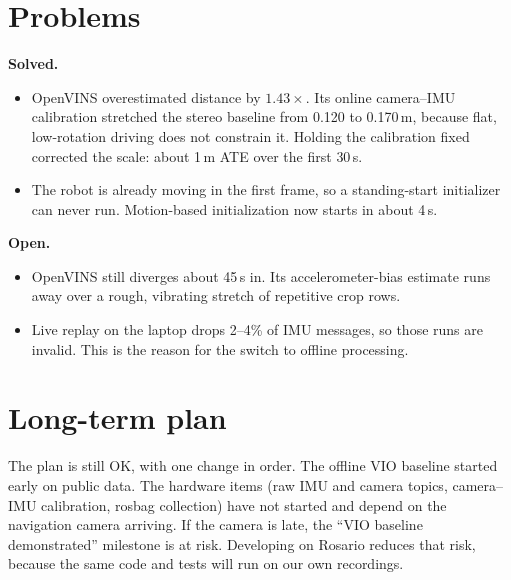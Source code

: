 \documentclass[12pt,reqno]{amsart}
\theoremstyle{plain}
\begin{document}
\section*{Problems}
\textbf{Solved.}
\begin{itemize}
\item OpenVINS overestimated distance by $1.43\times$. Its online camera--IMU calibration
stretched the stereo baseline from 0.120 to 0.170\,m, because flat, low-rotation driving does not
constrain it. Holding the calibration fixed corrected the scale: about 1\,m ATE over the first
30\,s.
\item The robot is already moving in the first frame, so a standing-start initializer can never
run. Motion-based initialization now starts in about 4\,s.
\end{itemize}
\textbf{Open.}
\begin{itemize}
\item OpenVINS still diverges about 45\,s in. Its accelerometer-bias estimate runs away over a
rough, vibrating stretch of repetitive crop rows.
\item Live replay on the laptop drops 2--4\% of IMU messages, so those runs are invalid. This is
the reason for the switch to offline processing.
\end{itemize}

\section*{Long-term plan}
The plan is still OK, with one change in order. The offline VIO baseline started early on
public data. The hardware items (raw IMU and camera topics, camera--IMU calibration, rosbag
collection) have not started and depend on the navigation camera arriving. If the camera is late,
the ``VIO baseline demonstrated'' milestone is at risk. Developing on Rosario reduces that risk,
because the same code and tests will run on our own recordings.
\end{document}

